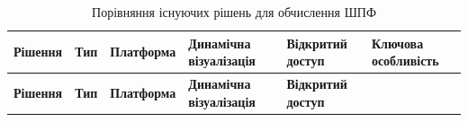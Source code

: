 \begin{longtable}[]{@{}
  >{\centering\arraybackslash}p{}
  >{\centering\arraybackslash}p{}
  >{\centering\arraybackslash}p{}
  >{\centering\arraybackslash}p{}
  >{\centering\arraybackslash}p{}
  >{\centering\arraybackslash}p{}@{}}
\caption[Порівняння існуючих рішень для обчислення ШПФ]{Порівняння
існуючих рішень для обчислення ШПФ}\tabularnewline
\toprule\noalign{}
\begin{minipage}[b]{\linewidth}\centering
\textbf{Рішення}
\end{minipage} & \begin{minipage}[b]{\linewidth}\centering
\textbf{Тип}
\end{minipage} & \begin{minipage}[b]{\linewidth}\centering
\textbf{Платформа}
\end{minipage} & \begin{minipage}[b]{\linewidth}\centering
\textbf{Динамічна візуалізація}
\end{minipage} & \begin{minipage}[b]{\linewidth}\centering
\textbf{Відкритий доступ}
\end{minipage} & \begin{minipage}[b]{\linewidth}\centering
\textbf{Ключова особливість}
\end{minipage} \\
\midrule\noalign{}
\endfirsthead
\toprule\noalign{}
\begin{minipage}[b]{\linewidth}\centering
\textbf{Рішення}
\end{minipage} & \begin{minipage}[b]{\linewidth}\centering
\textbf{Тип}
\end{minipage} & \begin{minipage}[b]{\linewidth}\centering
\textbf{Платформа}
\end{minipage} & \begin{minipage}[b]{\linewidth}\centering
\textbf{Динамічна візуалізація}
\end{minipage} & \begin{minipage}[b]{\linewidth}\centering
\textbf{Відкритий доступ}
\end{minipage} & \begin{minipage}[b]{\linewidth}\centering

\end{minipage}
\end{longtable}
